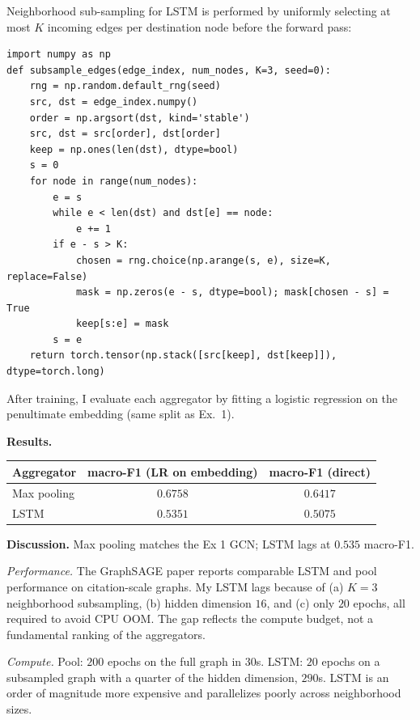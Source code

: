 \documentclass{article}
\begin{document}
\begin{tcolorbox}[colback=white, colframe=black!75, breakable, title=\textbf{Solution to Exercise 4}]
Neighborhood sub-sampling for LSTM is performed by uniformly selecting at most $K$ incoming edges per destination node before the forward pass:

\begin{lstlisting}[style=python2]
import numpy as np
def subsample_edges(edge_index, num_nodes, K=3, seed=0):
    rng = np.random.default_rng(seed)
    src, dst = edge_index.numpy()
    order = np.argsort(dst, kind='stable')
    src, dst = src[order], dst[order]
    keep = np.ones(len(dst), dtype=bool)
    s = 0
    for node in range(num_nodes):
        e = s
        while e < len(dst) and dst[e] == node:
            e += 1
        if e - s > K:
            chosen = rng.choice(np.arange(s, e), size=K, replace=False)
            mask = np.zeros(e - s, dtype=bool); mask[chosen - s] = True
            keep[s:e] = mask
        s = e
    return torch.tensor(np.stack([src[keep], dst[keep]]), dtype=torch.long)
\end{lstlisting}

After training, I evaluate each aggregator by fitting a logistic regression on the penultimate embedding (same split as Ex.~1).

\medskip
\textbf{Results.}

\begin{center}
\begin{tabular}{l|cc}
\toprule
Aggregator & macro-F1 (LR on embedding) & macro-F1 (direct) \\
\midrule
Max pooling & $\mathbf{0.6758}$ & $0.6417$ \\
LSTM & $0.5351$ & $0.5075$ \\
\bottomrule
\end{tabular}
\end{center}

\medskip
\textbf{Discussion.} Max pooling matches the Ex 1 GCN; LSTM lags at $0.535$ macro-F1.

\emph{Performance.} The GraphSAGE paper reports comparable LSTM and pool performance on citation-scale graphs. My LSTM lags because of (a) $K=3$ neighborhood subsampling, (b) hidden dimension $16$, and (c) only $20$ epochs, all required to avoid CPU OOM. The gap reflects the compute budget, not a fundamental ranking of the aggregators.

\emph{Compute.} Pool: $200$ epochs on the full graph in $30$s. LSTM: $20$ epochs on a subsampled graph with a quarter of the hidden dimension, $290$s. LSTM is an order of magnitude more expensive and parallelizes poorly across neighborhood sizes.


\end{tcolorbox}
\end{document}

